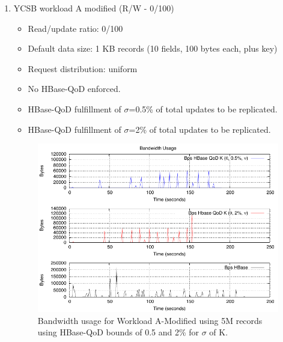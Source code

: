 \begin{enumerate}
Figure~\ref{fig-bandwidth-worloada} shows the results of three different sets of Qualities of Data for \emph{workload A}. During the execution of the workload A, in Figure~\ref{fig-bandwidth-worloada}, the highest peaks in replication traffic are observed without any type of HBase-QoD, i.e. just using plain HBase. This is due to the nature of eventual consistency itself, and the internal buffering mechanisms in HBase. Naturally, without HBase-QoD updates are being replicated such in best-effort~\footnote{Best-Effort delivery, http://en.wikipedia.org/wiki/Best-effort\_delivery} scenarios, where there is an unbounded limit on the number of updates shipped at a time and usually no data-semantics on which ones first or later. Therefore, the module here presented can adapt these limitations in cases of high traffic-loads, choosing first what matters more also.


\item{YCSB workload A modified (R/W - 0/100)}
	\begin{itemize}
	\item Read/update ratio: 0/100
	\item Default data size: 1 KB records (10 fields, 100 bytes each, plus key)
	\item Request distribution: uniform
	\item No HBase-QoD enforced.
	\item HBase-QoD fulfillment of $\sigma$=0.5\% of total updates to be replicated.	%
	\item HBase-QoD fulfillment of $\sigma$=2\% of total updates to be replicated.  %
	\end{itemize}


\begin{figure}
\centering
\includegraphics[scale=1.3]{figs/plot-packets-size-workloada-modified-allbounds-latest.pdf}
\caption{Bandwidth usage for Workload A-Modified using 5M records using HBase-QoD bounds of 0.5 and 2\% for $\sigma$ of K.}
\label{fig-bandwidth-worloada-modified}
\end{figure}


\end{enumerate}
